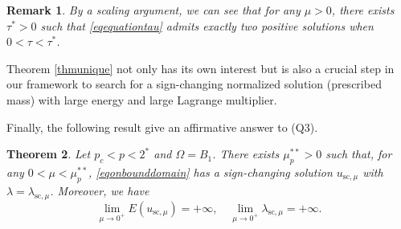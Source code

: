\documentclass[10pt,a4paper]{article}
\newtheorem{theorem}{Theorem}[section]
\newtheorem{remark}[theorem]{Remark}
\theoremstyle{definition} \theoremstyle{remark}
\numberwithin{equation}{section}
\newcommand{\la}{\lambda}
\begin{document}
\begin{remark}
 {By a scaling argument, we can see that for any $\mu > 0$, there exists $\tau^* > 0$ such that \eqref{eqequationtau} admits exactly two positive solutions when $0 < \tau < \tau^*$.}
\end{remark}

Theorem \ref{thmunique} not only has its own interest but is also a crucial step in our framework to search for a sign-changing  normalized  solution (prescribed mass) with large energy and large Lagrange multiplier.   









\vskip0.1in
Finally, the following result give an affirmative answer to (Q3).

\begin{theorem} \label{thmlarge}
	Let $p_c < p < 2^*$ and $\Omega = B_1$. There exists $\mu^{**}_p > 0$ such that, for any $0 < \mu < \mu^{**}_p$, \eqref{eqonbounddomain} has a sign-changing solution $u_{\text{sc},\mu}$ with $\la=\la_{\text{sc},\mu}$. Moreover,   we have 
$$\lim_{\mu \to 0^+}E(u_{\text{sc},\mu}) = +\infty, \quad  \lim_{\mu \to 0^+}\la_{\text{sc},\mu} = +\infty.$$
\end{theorem}
\end{document}
